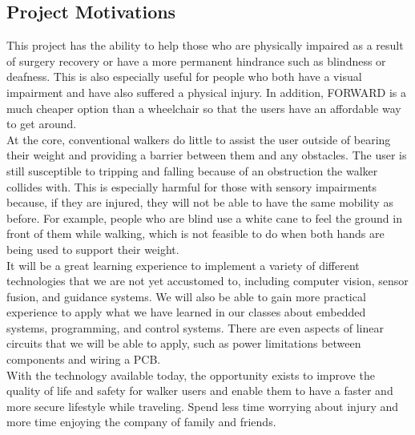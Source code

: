 \subsection{Project Motivations}
\indent This project has the ability to help those who are physically impaired as a result of surgery recovery or have a more permanent hindrance such as blindness or deafness. This is also especially useful for people who both have a visual impairment and have also suffered a physical injury. In addition, FORWARD is a much cheaper option than a wheelchair so that the users have an affordable way to get around. \\

\noindent At the core, conventional walkers do little to assist the user outside of bearing their weight and providing a barrier between them and any obstacles. The user is still susceptible to tripping and falling because of an obstruction the walker collides with. This is especially harmful for those with sensory impairments because, if they are injured, they will not be able to have the same mobility as before. For example, people who are blind use a white cane to feel the ground in front of them while walking, which is not feasible to do when both hands are being used to support their weight. \\

\noindent It will be a great learning experience to implement a variety of different technologies that we are not yet accustomed to, including computer vision, sensor fusion, and guidance systems. We will also be able to gain more practical experience to apply what we have learned in our classes about embedded systems, programming, and control systems. There are even aspects of linear circuits that we will be able to apply, such as power limitations between components and wiring a PCB. \\

\noindent With the technology available today, the opportunity exists to improve the quality of life and safety for walker users and enable them to have a faster and more secure lifestyle while traveling. Spend less time worrying about injury and more time enjoying the company of family and friends. \\